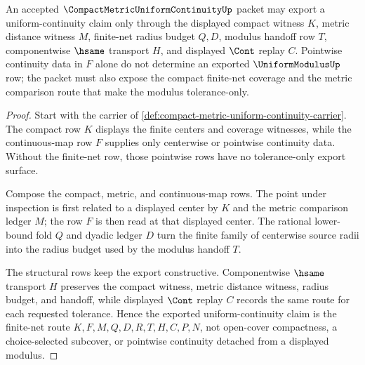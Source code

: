 \begin{theorem}
\label{thm:compact-metric-uniform-continuity-explicit-modulus-scope}
An accepted $\CompactMetricUniformContinuityUp$ packet may export a uniform-continuity claim only through the displayed compact witness $K$, metric distance witness $M$, finite-net radius budget $Q,D$, modulus handoff row $T$, componentwise $\hsame$ transport $H$, and displayed $\Cont$ replay $C$. Pointwise continuity data in $F$ alone do not determine an exported $\UniformModulusUp$ row; the packet must also expose the compact finite-net coverage and the metric comparison route that make the modulus tolerance-only.
\end{theorem}
\begin{proof}
Start with the carrier of \autoref{def:compact-metric-uniform-continuity-carrier}. The compact row $K$ displays the finite centers and coverage witnesses, while the continuous-map row $F$ supplies only centerwise or pointwise continuity data. Without the finite-net row, those pointwise rows have no tolerance-only export surface.

Compose the compact, metric, and continuous-map rows. The point under inspection is first related to a displayed center by $K$ and the metric comparison ledger $M$; the row $F$ is then read at that displayed center. The rational lower-bound fold $Q$ and dyadic ledger $D$ turn the finite family of centerwise source radii into the radius budget used by the modulus handoff $T$.

The structural rows keep the export constructive. Componentwise $\hsame$ transport $H$ preserves the compact witness, metric distance witness, radius budget, and handoff, while displayed $\Cont$ replay $C$ records the same route for each requested tolerance. Hence the exported uniform-continuity claim is the finite-net route $K,F,M,Q,D,R,T,H,C,P,N$, not open-cover compactness, a choice-selected subcover, or pointwise continuity detached from a displayed modulus.
\end{proof}

